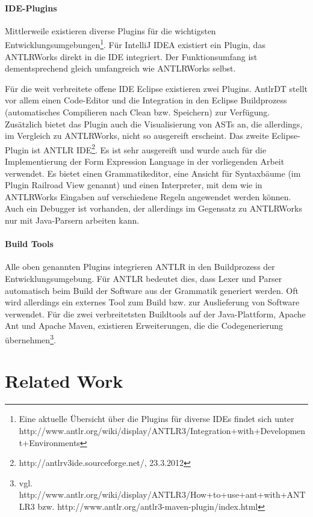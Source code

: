 \subsubsection{IDE-Plugins}

Mittlerweile existieren diverse Plugins für die wichtigsten Entwicklungsumgebungen\footnote{Eine aktuelle Über\-sicht über die Plugins für diverse IDEs findet sich unter http://www.antlr.org/wiki/display/ANTLR3/Integration+with+Development+Environments}. Für IntelliJ IDEA existiert ein Plugin, das ANTLRWorks direkt in die IDE integriert. Der Funktionsumfang ist dement\-sprech\-end gleich umfangreich wie ANTLRWorks selbst.

Für die weit verbreitete offene IDE Eclipse existieren zwei Plugins. AntlrDT stellt vor allem einen Code-Editor und die Integration in den Eclipse Buildprozess (automatisches Compilieren nach Clean bzw. Speichern) zur Verfügung. Zu\-sätz\-lich bietet das Plugin auch die Visualisierung von ASTs an, die allerdings, im Vergleich zu ANTLRWorks, nicht so ausgereift erscheint. Das zweite Eclipse-Plugin ist ANTLR IDE\footnote{http://antlrv3ide.sourceforge.net/, 23.3.2012}. Es ist sehr ausgereift und wurde auch für die Implementierung der Form Expression Language in der vorliegenden Arbeit verwendet. Es bietet einen Grammatikeditor, eine Ansicht für Syntaxbäume (im Plugin Railroad View genannt) und einen Interpreter, mit dem wie in ANTLRWorks Eingaben auf verschiedene Regeln angewendet werden können. Auch ein Debugger ist vorhanden, der allerdings im Gegensatz zu ANTLRWorks nur mit Java-Parsern arbeiten kann.

\subsubsection{Build Tools} 

Alle oben genannten Plugins integrieren ANTLR in den Buildprozess der Entwicklungsumgebung. Für ANTLR bedeutet dies, dass Lexer und Parser automatisch beim Build der Software aus der Grammatik generiert werden. Oft wird allerdings ein externes Tool zum Build bzw. zur Auslieferung von Software verwendet. Für die zwei verbreitetsten Buildtools auf der Java-Plattform, Apache Ant und Apache Maven, existieren Erweiterungen, die die Codegenerierung übernehmen\footnote{vgl. http://www.antlr.org/wiki/display/ANTLR3/How+to+use+ant+with+ANTLR3 bzw. http://www.antlr.org/antlr3-maven-plugin/index.html}.



\chapter{Related Work}
\label{related_work}

